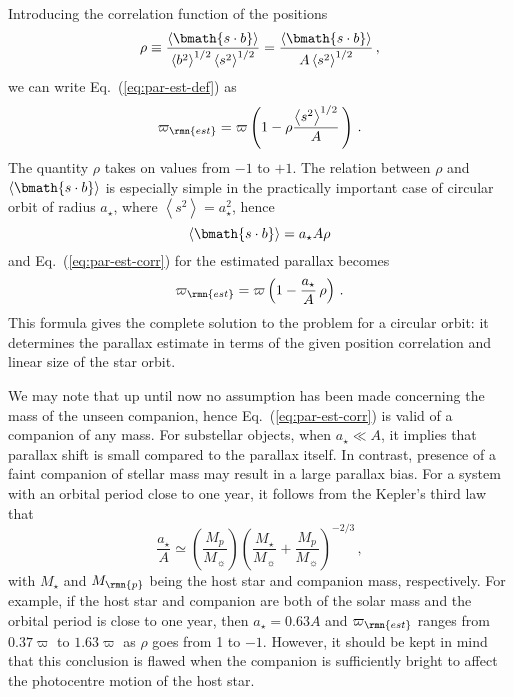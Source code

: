 \documentclass[fleqn,usenatbib,useAMS,usedcolumn]{mnras}
\begin{document}
Introducing the correlation function of the positions
\begin{equation}\label{eq:corrfunc-def}
  \rho
  \equiv
  \frac{\left\langle\bmath{s\cdot b}\right\rangle}
       {\left\langle b^2\right\rangle^{1/2}\left\langle s^2\right\rangle^{1/2}}
  =
  \frac{\left\langle\bmath{s\cdot b}\right\rangle}
       {A\left\langle s^2\right\rangle^{1/2}}\,,
\end{equation}
we can write Eq.~(\ref{eq:par-est-def}) as
\begin{equation}\label{eq:par-est-corr}
 \varpi_\rmn{est}
 =
 \varpi
 \left(1-\rho
 \frac{\left\langle s^2\right\rangle^{1/2}}{A}\,
 \right)\,.
\end{equation}
The quantity $\rho$ takes on values from $-1$ to $+1$. The relation between $\rho$ and $\left\langle\bmath{s\cdot b}\right\rangle$ is especially simple in the practically important case of circular orbit of radius $a_\star$, where $\left\langle s^2\right\rangle=a_\star^2$, hence
\begin{equation}
  \left\langle\bmath{s\cdot b}\right\rangle=a_\star A\rho
\end{equation}
and Eq.~(\ref{eq:par-est-corr}) for the estimated parallax becomes
\begin{equation}\label{eq:par-est-circ}
 \varpi_\rmn{est}=\varpi\left(1-\frac{a_\star}{A}\,\rho\right)\,.
\end{equation}
This formula gives the complete solution to the problem for a circular orbit: it determines the parallax estimate in terms of the given position correlation and linear size of the star orbit.

We may note that up until now no assumption has been made concerning the mass of the unseen companion, hence Eq.~(\ref{eq:par-est-corr}) is valid of a companion of any mass. For substellar objects, when $a_\star\ll A$, it implies that parallax shift is small compared to the parallax itself. In contrast, presence of a faint companion of stellar mass may result in a large parallax bias.  For a system with an orbital period close to one year, it follows from the Kepler's third law that
\begin{equation}\label{eq:kepler}
  \frac{a_\star}{A}\simeq\left(\frac{M_p}{M_{\sun}}\right)\left(\frac{M_\star}{M_{\sun}}+\frac{M_p}{M_{\sun}}\right)^{-2/3}\,,
\end{equation}
 with $M_\star$ and $M_\rmn{p}$ being the host star and companion mass, respectively. For example, if the host star and companion are both of the solar mass and the orbital period is close to one year, then $a_\star=0.63A$ and $\varpi_\rmn{est}$ ranges from $0.37\varpi$ to $1.63\varpi$ as $\rho$ goes from 1 to $-1$. However, it should be kept in mind that this conclusion is flawed when the companion is sufficiently bright to affect the photocentre motion of the host star.
\end{document}
